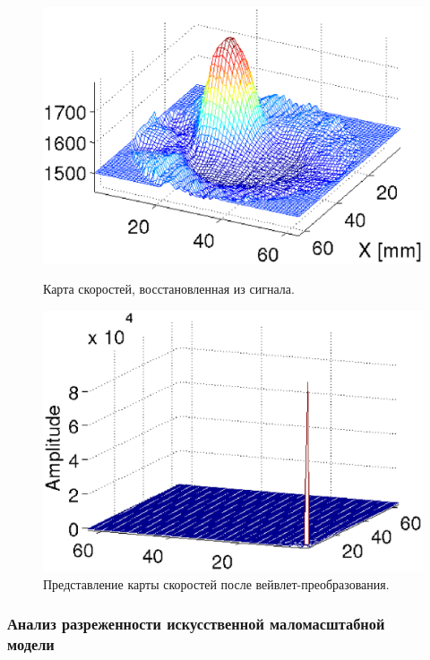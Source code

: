 \documentclass[14pt]{matmex-diploma-custom}
\begin{document}
\begin{figure}[!tbp]
    \centering
    \begin{minipage}[b]{0.45\textwidth}
        \includegraphics[width=\textwidth]{pics_eps/speed_map.eps}
        \caption{\small Карта скоростей, восстановленная из сигнала.}
        \label{fig:speedmap}
    \end{minipage}
    \hfill
    \begin{minipage}[b]{0.45\textwidth}
        \includegraphics[width=\textwidth]{pics_eps/freq_domain.eps}
        \caption{\small Представление карты скоростей после вейвлет-преобразования.}
        \label{fig:waveletted}
    \end{minipage}
\end{figure}

\subsubsection*{Анализ разреженности искусственной маломасштабной\\ модели}
\end{document}
